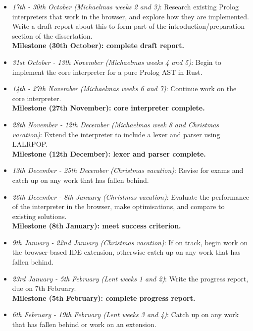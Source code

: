 \documentclass{article}
\begin{document}
\begin{itemize}

\item \emph{17th - 30th October (Michaelmas weeks 2 and 3)}: Research existing Prolog interpreters that work in the browser, and explore how they are implemented. Write a draft report about this to form part of the introduction/preparation section of the dissertation. \\
{\bf Milestone (30th October): complete draft report.}

\item \emph{31st October - 13th November (Michaelmas weeks 4 and 5)}: Begin to implement the core interpreter for a pure Prolog AST in Rust.

\item \emph{14th - 27th November (Michaelmas weeks 6 and 7)}: Continue work on the core interpreter. \\
{\bf Milestone (27th November): core interpreter complete.}

\item \emph{28th November - 12th December (Michaelmas week 8 and Christmas vacation)}: Extend the interpreter to include a lexer and parser using LALRPOP. \\
{\bf Milestone (12th December): lexer and parser complete.}

\item \emph{13th December - 25th December (Christmas vacation)}: Revise for exams and catch up on any work that has fallen behind.

\item \emph{26th December - 8th January (Christmas vacation)}: Evaluate the performance of the interpreter in the browser, make optimisations, and compare to existing solutions. \\
{\bf Milestone (8th January): meet success criterion.}

\item \emph{9th January - 22nd January (Christmas vacation)}: If on track, begin work on the browser-based IDE extension, otherwise catch up on any work that has fallen behind.

\item \emph{23rd January - 5th February (Lent weeks 1 and 2)}: Write the progress report, due on 7th February. \\
{\bf Milestone (5th February): complete progress report.}

\item \emph{6th February - 19th February (Lent weeks 3 and 4)}: Catch up on any work that has fallen behind or work on an extension.


\end{itemize}
\end{document}
